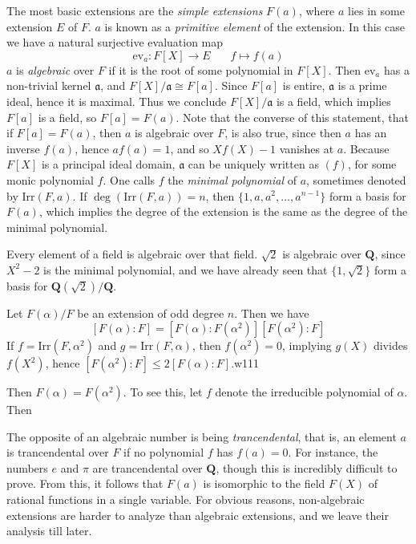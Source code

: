 The most basic extensions are the {\it simple extensions} $F(a)$, where $a$ lies in some extension $E$ of $F$. $a$ is known as a {\it primitive element} of the extension. In this case we have a natural surjective evaluation map
%
\[ \text{ev}_a: F[X] \to E\ \ \ \ \ \ \ \ f \mapsto f(a) \]
%
$a$ is {\it algebraic} over $F$ if it is the root of some polynomial in $F[X]$. Then $\text{ev}_a$ has a non-trivial kernel $\mathfrak{a}$, and $F[X]/\mathfrak{a} \cong F[a]$. Since $F[a]$ is entire, $\mathfrak{a}$ is a prime ideal, hence it is maximal. Thus we conclude $F[X]/\mathfrak{a}$ is a field, which implies $F[a]$ is a field, so $F[a] = F(a)$. Note that the converse of this statement, that if $F[a] = F(a)$, then $a$ is algebraic over $F$, is also true, since then $a$ has an inverse $f(a)$, hence $af(a) = 1$, and so $Xf(X) - 1$ vanishes at $a$. Because $F[X]$ is a principal ideal domain, $\mathfrak{a}$ can be uniquely written as $(f)$, for some monic polynomial $f$. One calls $f$ the {\it minimal polynomial} of $a$, sometimes denoted by $\text{Irr}(F,a)$. If $\deg(\text{Irr}(F,a)) = n$, then $\{ 1, a, a^2, \dots, a^{n-1} \}$ form a basis for $F(a)$, which implies the degree of the extension is the same as the degree of the minimal polynomial.

\begin{example}
    Every element of a field is algebraic over that field. $\sqrt{2}$ is algebraic over $\mathbf{Q}$, since $X^2 - 2$ is the minimal polynomial, and we have already seen that $\{ 1, \sqrt{2} \}$ form a basis for $\mathbf{Q}(\sqrt{2})/\mathbf{Q}$.
\end{example}

\begin{example}
	Let $F(\alpha)/F$ be an extension of odd degree $n$. Then we have
	\[ [F(\alpha): F] = [F(\alpha): F(\alpha^2)] [F(\alpha^2): F] \]
	If $f = \text{Irr}(F,\alpha^2)$ and $g = \text{Irr}(F,\alpha)$, then $f(\alpha^2) = 0$, implying $g(X)$ divides $f(X^2)$, hence $[F(\alpha^2): F] \leq 2 [F(\alpha): F]$.w111


	Then $F(\alpha) = F(\alpha^2)$. To see this, let $f$ denote the irreducible polynomial of $\alpha$. Then
\end{example}

\begin{remark}
	The opposite of an algebraic number is being {\it trancendental}, that is, an element $a$ is trancendental over $F$ if no polynomial $f$ has $f(a) = 0$. For instance, the numbers $e$ and $\pi$ are trancendental over $\mathbf{Q}$, though this is incredibly difficult to prove. From this, it follows that $F(a)$ is isomorphic to the field $F(X)$ of rational functions in a single variable. For obvious reasons, non-algebraic extensions are harder to analyze than algebraic extensions, and we leave their analysis till later.
\end{remark}


